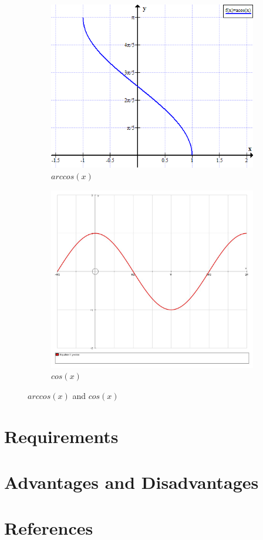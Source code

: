 \documentclass[10pt]{article}
\begin{document}
\begin{figure}
  \centering
  \begin{subfigure}[b]{0.4\linewidth}
    \includegraphics[width=\linewidth]{image/arccos.png}
    \caption{$arccos(x)$}
  \end{subfigure}
  \begin{subfigure}[b]{0.4\linewidth}
    \includegraphics[width=\linewidth]{image/cos.jpg}
    \caption{$cos(x)$}
  \end{subfigure}
  \caption{$arccos(x)$ and $cos(x)$}
  \label{fig:coffee}
\end{figure}


\section{Requirements}

\section{Advantages and Disadvantages}

\section{References}
 
\end{document}
